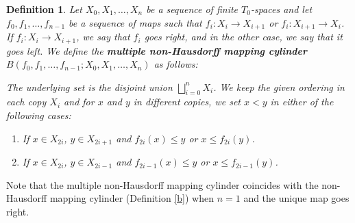 \documentclass[12pt,a4paper,twoside, reqno, tbtags]{article}
\numberwithin{equation}{section}
\newtheorem{definition}{Definition}[section]
\begin{document}
\begin{definition}\cite{Barmak}\label{h}
    Let $X_0, X_1, \dots, X_n$ be a sequence of finite $T_0$-spaces and let $f_0, f_1, \dots, f_{n-1}$ be a sequence of maps such that $f_i : X_i \to X_{i+1}$ or $f_i : X_{i+1} \to X_i$. If $f_i: X_i \to X_{i+1}$, we say that $f_i$ \textit{goes right}, and in the other case, we say that it \textit{goes left}. We define the \textbf{multiple non-Hausdorff mapping cylinder} $B(f_0, f_1, \dots, f_{n-1}; X_0, X_1, \dots, X_n)$ as follows:
    
    \noindent The underlying set is the disjoint union $\bigsqcup_{i=0}^n X_i$. We keep the given ordering in each copy $X_i$ and for $x$ and $y$ in different copies, we set $x < y$ in either of the following cases:
\begin{enumerate}
    \item If $x \in X_{2i}$, $y \in X_{2i+1}$ and $f_{2i}(x) \leq y$ or $x \leq f_{2i}(y)$.
    \item If $x \in X_{2i}$, $y \in X_{2i-1}$ and $f_{2i-1}(x) \leq y$ or $x \leq f_{2i-1}(y)$.
\end{enumerate}
\end{definition}
    \noindent Note that the multiple non-Hausdorff mapping cylinder coincides with the non-Hausdorff mapping cylinder (Definition \ref{b}) when $n=1$ and the unique map goes right.
    
\end{document}
